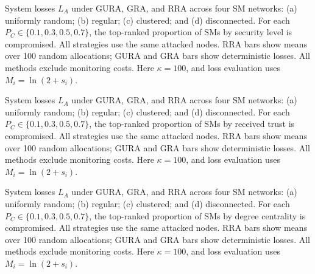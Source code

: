 \caption{System losses $L_A$ under GURA, GRA, and RRA across four SM networks: (a) uniformly random; (b) regular; (c) clustered; and (d) disconnected. For each $P_C\in\{0.1,0.3,0.5,0.7\}$, the top-ranked proportion of SMs by security level is compromised. All strategies use the same attacked nodes. RRA bars show means over 100 random allocations; GURA and GRA bars show deterministic losses. All methods exclude monitoring costs. Here $\kappa=100$, and loss evaluation uses $M_i=\ln(2+s_i)$.}

\caption{System losses $L_A$ under GURA, GRA, and RRA across four SM networks: (a) uniformly random; (b) regular; (c) clustered; and (d) disconnected. For each $P_C\in\{0.1,0.3,0.5,0.7\}$, the top-ranked proportion of SMs by received trust is compromised. All strategies use the same attacked nodes. RRA bars show means over 100 random allocations; GURA and GRA bars show deterministic losses. All methods exclude monitoring costs. Here $\kappa=100$, and loss evaluation uses $M_i=\ln(2+s_i)$.}

\caption{System losses $L_A$ under GURA, GRA, and RRA across four SM networks: (a) uniformly random; (b) regular; (c) clustered; and (d) disconnected. For each $P_C\in\{0.1,0.3,0.5,0.7\}$, the top-ranked proportion of SMs by degree centrality is compromised. All strategies use the same attacked nodes. RRA bars show means over 100 random allocations; GURA and GRA bars show deterministic losses. All methods exclude monitoring costs. Here $\kappa=100$, and loss evaluation uses $M_i=\ln(2+s_i)$.}

